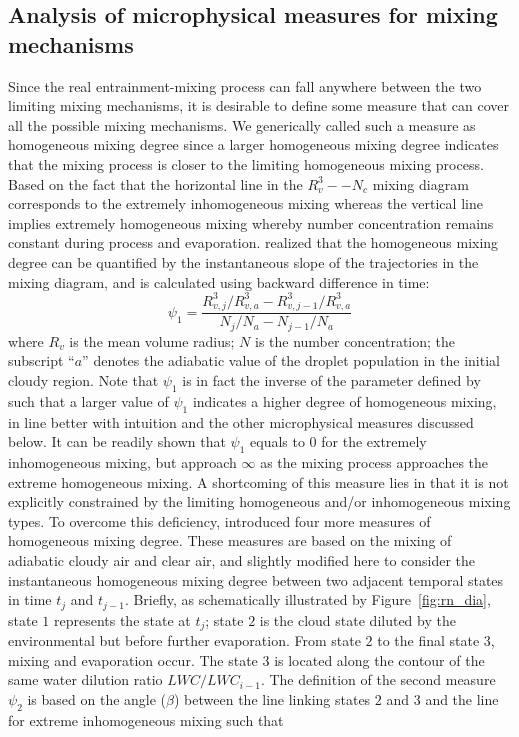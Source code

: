 \documentclass[draft,linenumbers]{agujournal}
\newcommand{\Fig}[1]{Figure~\ref{#1}}
\begin{document}
\subsection{Analysis of microphysical measures for mixing mechanisms}
Since the real entrainment-mixing process can fall anywhere between the two limiting mixing mechanisms, it is desirable to define some measure that can cover all the possible mixing mechanisms. We generically called such a measure as homogeneous mixing degree since a larger homogeneous mixing degree indicates that the mixing process is closer to the limiting homogeneous mixing process. Based on the fact that the horizontal line in the $R_v^3−-N_c$ mixing diagram corresponds to the extremely inhomogeneous mixing whereas the vertical line implies extremely homogeneous mixing { whereby number concentration remains constant during process and evaporation. \citet{And09} realized that} the homogeneous mixing degree can be quantified by the instantaneous slope of the trajectories in the mixing diagram, and is calculated using backward difference in time: 
\begin{equation}
\psi_1 = \frac{R_{v,j}^3/R_{v,a}^3 - R_{v,j-1}^3/R_{v,a}^3}{N_{j}/N_a - N_{j-1}/N_a}
\label{phi1}
\end{equation}
where $R_v$ is the mean volume radius; $N$ is the number concentration; the subscript ``$a$'' denotes the adiabatic value of the droplet population in the initial cloudy region. Note that $\psi_1$ is in fact the inverse of the parameter defined by \citet{And09} such that a larger value of $\psi_1$ indicates a higher degree of homogeneous mixing, in line better with intuition and the other microphysical measures discussed below. It can be readily shown that $\psi_1$ equals to $0$ for the extremely inhomogeneous mixing, but approach $\infty$ as the mixing process approaches the extreme homogeneous mixing. A shortcoming of this measure lies in that it is not explicitly constrained by the limiting homogeneous and/or inhomogeneous mixing types. To overcome this deficiency, \citet{Lu2013a, Lu2013b, Lu2014} introduced four more measures of homogeneous mixing degree. These measures are based on the mixing of adiabatic cloudy air and clear air, and slightly modified here to consider the instantaneous homogeneous mixing degree between two adjacent 
temporal states in time $t_j$ and $t_{j-1}$. 
{ Briefly, as schematically illustrated by \Fig{fig:rn_dia}, state $1$ represents the state at $t_j$; state $2$ is the cloud state diluted by the environmental but before further evaporation. From state $2$ to the final state $3$, mixing and evaporation occur. The state $3$ is located along the contour of the same water dilution ratio $LWC/LWC_{i-1}$. The definition of the second measure $\psi_2$ is based on the angle ($\beta$) between the line linking states $2$ and $3$ and the line for extreme inhomogeneous mixing such that}
\end{document}
